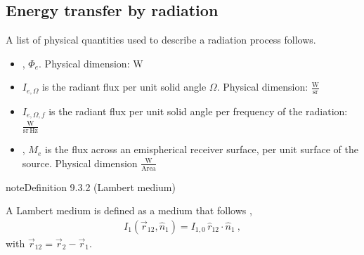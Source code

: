 \documentclass[letterpaper,10pt,english]{jupyterBook}
\begin{document}
\subsection{Energy transfer by radiation}
\label{\detokenize{ch/heat-transfer-radiation:energy-transfer-by-radiation}}\label{\detokenize{ch/heat-transfer-radiation:classical-thermodynamics-heat-transmission-radiation-energy-transfer}}
\sphinxAtStartPar
A list of physical quantities used to describe a radiation process follows.
\begin{itemize}
\item {} 
\sphinxAtStartPar
{}, \(\Phi_e\). Physical dimension: \(\text{W}\)

\item {} 
\sphinxAtStartPar
{} \(I_{e, \Omega}\) is the radiant flux per unit solid angle \(\Omega\). Physical dimension: \(\frac{\text{W}}{\text{sr}}\)

\item {} 
\sphinxAtStartPar
{} \(I_{e, \Omega, f}\) is the radiant flux per unit solid angle per frequency of the radiation: \(\frac{\text{W}}{\text{sr} \, \text{Hz}}\)

\item {} 
\sphinxAtStartPar
{}, \(M_e\) is the flux across an emispherical receiver surface, per unit surface of the source. Physical dimension \(\frac{\text{W}}{\text{Area}}\)

\end{itemize}
\label{ch/heat-transfer-radiation:definition-1}
\begin{sphinxadmonition}{note}{Definition 9.3.2 (Lambert medium)}



\sphinxAtStartPar
A Lambert medium is defined as a medium that follows ,
\begin{equation*}
\begin{split}I_{1}(\vec{r}_{12}, \hat{n}_1) = I_{1,0} \, \hat{r}_{12} \cdot \hat{n}_1 \ ,\end{split}
\end{equation*}
\sphinxAtStartPar
with \(\vec{r}_{12} = \vec{r}_2 - \vec{r}_1\).
\end{sphinxadmonition}
\end{document}
